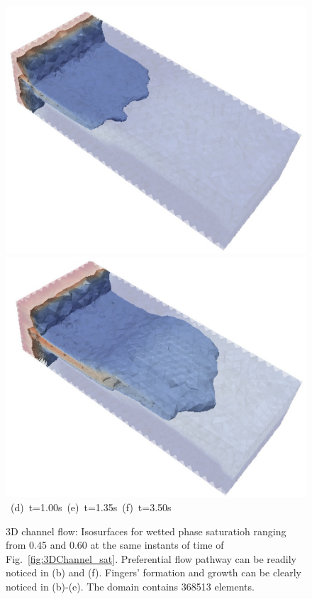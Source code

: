 \begin{landscape}
\begin{figure}[ht]
{{            \includegraphics[width=.45\textwidth]{./Pics1/3D_Channel/3D_Channel_Saturation1Isosurface_D150c.pdf}
            \includegraphics[width=.45\textwidth]{./Pics1/3D_Channel/3D_Channel_Saturation1Isosurface_D400c.pdf} }
      \hbox{\hspace{3.cm} (d) t=1.00s \hspace{3.cm} (e) t=1.35s\hspace{4.cm} (f) t=3.50s }}
\caption{3D channel flow: Isosurfaces for wetted phase saturatioh ranging from 0.45 and 0.60 at the same instants of time of Fig.~\ref{fig:3DChannel_sat}. Preferential flow pathway can be readily noticed in (b) and (f). Fingers' formation and growth can be clearly noticed in (b)-(e). The domain contains 368513  elements.}
\label{fig:3DChannel_Isosurf}
\end{figure}
\end{landscape}
\clearpage


